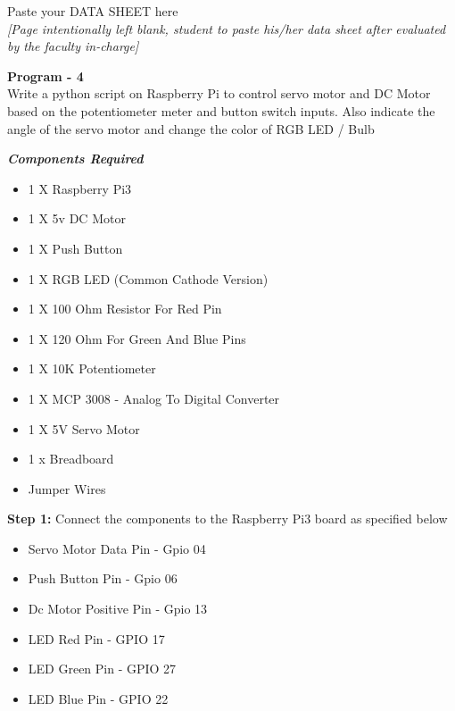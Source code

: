 \documentclass[12pt,a4paper]{article}
\begin{document}
Paste your DATA SHEET here\\
\textit{[Page intentionally left blank, student to paste his/her data sheet after evaluated by the faculty in-charge] }
\clearpage
\begin{center}
{\large {\textbf{Program - 4}}\\
Write a python script on Raspberry Pi to control servo motor and DC Motor based on the
potentiometer meter and button switch inputs. Also indicate the angle of the servo motor and change the color of RGB LED / Bulb}
\end{center}
\begin{flushleft}
\textbf{\textit{Components Required}}
\begin{itemize}[noitemsep,nolistsep]
\item 1 X Raspberry Pi3
\item 1 X  5v DC Motor
\item 1 X Push Button
\item 1 X  RGB LED (Common Cathode Version)
\item 1 X  100 Ohm Resistor For Red Pin
\item 1 X 120 Ohm For Green And Blue Pins
\item 1 X 10K Potentiometer
\item 1 X MCP 3008 - Analog To Digital Converter
\item 1 X 5V Servo Motor
\item 1 x Breadboard
\item Jumper Wires
\end{itemize}
\vspace{5mm}

\textbf{Step 1:} Connect the components to the Raspberry Pi3 board as specified below \\
\vspace{5mm}
\begin{itemize}[noitemsep,nolistsep]
\item Servo Motor Data Pin - Gpio 04
\item Push Button Pin - Gpio 06
\item Dc Motor Positive Pin - Gpio 13
\item LED Red Pin - GPIO 17
\item LED Green Pin - GPIO 27
\item LED Blue Pin - GPIO 22
\end{itemize}
\vspace{5mm}


\end{flushleft}
\end{document}
